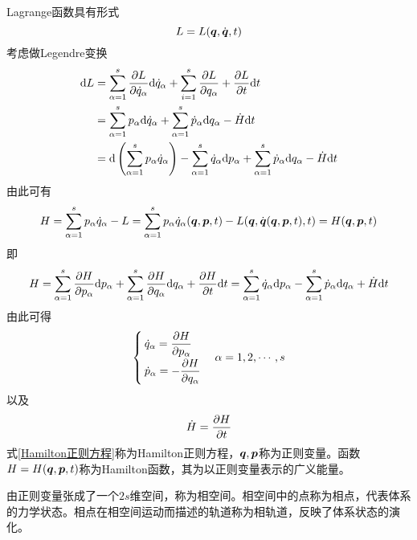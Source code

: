 Lagrange函数具有形式
\begin{equation*}
	L = L(\boldsymbol{q},\dot{\boldsymbol{q}},t)
\end{equation*}
考虑做Legendre变换
\begin{align*}
	\mathrm{d} L & = \sum_{\alpha=1}^s \frac{\partial L}{\partial \dot{q}_\alpha} \mathrm{d} \dot{q}_\alpha + \sum_{i=1}^s \frac{\partial L}{\partial q_\alpha} + \frac{\partial L}{\partial t} \mathrm{d} t \\
	& = \sum_{\alpha=1}^s p_\alpha \mathrm{d} \dot{q}_\alpha + \sum_{\alpha=1}^s \dot{p}_\alpha \mathrm{d} q_\alpha - \dot{H} \mathrm{d} t \\
	& = \mathrm{d} \left(\sum_{\alpha=1}^s p_\alpha \dot{q}_\alpha \right) - \sum_{\alpha=1}^s \dot{q}_\alpha \mathrm{d} p_\alpha + \sum_{\alpha=1}^s \dot{p}_\alpha \mathrm{d}q_\alpha - \dot{H} \mathrm{d} t
\end{align*}
由此可有
\begin{equation}
	H = \sum_{\alpha=1}^s p_\alpha \dot{q}_\alpha - L = \sum_{\alpha=1}^s p_\alpha \dot{q}_\alpha(\boldsymbol{q},\boldsymbol{p},t) - L(\boldsymbol{q},\dot{\boldsymbol{q}}(\boldsymbol{q},\boldsymbol{p},t),t) = H(\boldsymbol{q},\boldsymbol{p},t)
\end{equation}
即
\begin{equation*}
	H = \sum_{\alpha=1}^s \frac{\partial H}{\partial p_\alpha} \mathrm{d} p_\alpha + \sum_{\alpha=1}^s \frac{\partial H}{\partial q_\alpha} \mathrm{d} q_\alpha + \frac{\partial H}{\partial t} \mathrm{d} t = \sum_{\alpha=1}^s \dot{q}_\alpha \mathrm{d} p_\alpha - \sum_{\alpha=1}^s \dot{p}_\alpha \mathrm{d} q_\alpha + \dot{H} \mathrm{d} t
\end{equation*}
由此可得
\begin{equation}
	\begin{cases}
		\dot{q}_\alpha = \dfrac{\partial H}{\partial p_\alpha} \\[1.5ex]
		\dot{p}_\alpha = -\dfrac{\partial H}{\partial q_\alpha} 
	\end{cases}
	\alpha = 1,2,\cdots,s
	\label{Hamilton正则方程}
\end{equation}
以及
\begin{equation}
	\dot{H} = \frac{\partial H}{\partial t}
\end{equation}
式\eqref{Hamilton正则方程}称为{\heiti Hamilton正则方程}，$\boldsymbol{q},\boldsymbol{p}$称为{\heiti 正则变量}。函数$H = H(\boldsymbol{q},\boldsymbol{p},t)$称为{\heiti Hamilton函数}，其为以正则变量表示的广义能量。

由正则变量张成了一个$2s$维空间，称为{\heiti 相空间}。相空间中的点称为{\heiti 相点}，代表体系的力学状态。相点在相空间运动而描述的轨道称为{\heiti 相轨道}，反映了体系状态的演化。


